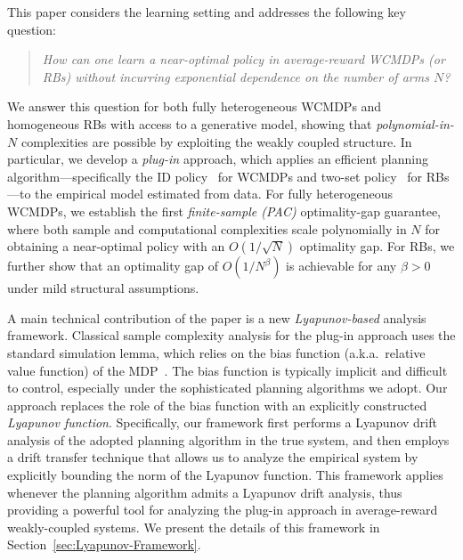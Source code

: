 \documentclass[mnsc,nonblindrev]{informs3}
\begin{document}
This paper considers the learning setting and addresses the following key question:
\begin{quote}
\emph{How can one learn a near-optimal policy in average-reward WCMDPs (or RBs) without incurring exponential dependence on the number of arms $N$?}
\end{quote}
We answer this question for both {fully heterogeneous} WCMDPs  and {homogeneous} RBs with access to a generative model, showing that \emph{polynomial-in-$N$} complexities are possible by exploiting the weakly coupled structure. In particular, we develop a \emph{plug-in} approach, which applies an efficient planning algorithm---specifically the ID policy~\citep{zhang2025projection} for WCMDPs and two-set policy~\citep{hong2024achieving} for RBs---to the empirical model estimated from data. For fully heterogeneous WCMDPs, we establish the first \emph{finite-sample (PAC)} optimality-gap guarantee, where both sample and computational complexities scale polynomially in $N$ for obtaining a near-optimal policy with an $O(1/\sqrt{N})$ optimality gap. 
For RBs, we further show that an optimality gap of $O(1/N^\beta)$ is achievable for any $\beta>0$ under mild structural assumptions.

A main technical contribution of the paper is a new \emph{Lyapunov-based} analysis framework. Classical sample complexity analysis for the plug-in approach uses the standard simulation lemma, which relies on the bias function (a.k.a.\ relative value function) of the MDP~\citep{zurek_plug-approach_2024,li_breaking_2020,agarwal_model-based_2020}. The bias function is typically implicit and difficult to control, especially under the sophisticated planning algorithms we adopt. Our approach replaces the role of the bias function with an explicitly constructed \emph{Lyapunov function}. Specifically, our framework first performs a Lyapunov drift analysis of the adopted planning algorithm in the true system, and then employs a drift transfer technique that allows us to analyze the empirical system by explicitly bounding the norm of the Lyapunov function. This framework applies whenever the planning algorithm admits a Lyapunov drift analysis, thus providing a powerful tool for analyzing the plug-in approach in average-reward weakly-coupled systems. We present the details of this framework in  Section~\ref{sec:Lyapunov-Framework}.
\end{document}
